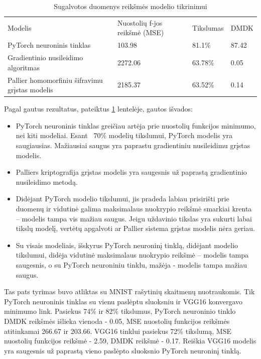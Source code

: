 \documentclass{VUMIFInfBakalaurinis}
\begin{document}
\begin{table}[h]
\begin{adjustbox}{width=\textwidth,center=\textwidth}
\begin{tabular}{|l|l|l|l|}
\cline{1-4}
Modelis & Nuostolių f-jos reikšmė (MSE) & Tikslumas & DMDK  \\\cline{1-4}
PyTorch neuroninis tinklas & 103.98 & 81.1\% & 87.42  \\\cline{1-4}
Gradientinio nusileidimo algoritmas & 2272.06 & 63.78\% & 0.05 \\\cline{1-4}
Pallier homomorfiniu šifravimu grįstas modelis & 2185.37 & 63.52\% & 0.14 \\\cline{1-4}
\end{tabular}
\end{adjustbox}
\caption{Sugalvotos duomenys reikšmės modelio tikrinimui}
\label{tab:DMDK rezultatai}
\end{table}

\par Pagal gautus rezultatus, pateiktus \ref{tab:DMDK rezultatai} lentelėje, gautos išvados:
\begin{itemize}
    \item PyTorch neuroninis tinklas greičiau artėja prie nuostolių funkcijos minimumo, nei kiti modeliai. Esant ~70\% modelių tikslumui, PyTorch modelis yra saugiausias. Mažiausiai saugus yra paprastu gradientiniu nusileidimu grįstas modelis. 
    \item Palliers kriptografija grįstas modelis yra saugesnis už paprastą gradientinio nusileidimo metodą.
    \item Didėjant PyTorch modelio tikslumui, jis pradeda labiau prisirišti prie duomenų ir vidutinė galima maksimalaus nuokrypio reikšmė smarkiai krenta – modelis tampa vis mažiau saugus. Jeigu uždavinio tikslas yra sukurti labai tikslų modelį, vertėtų apgalvoti ar Pallier sistema grįstas modelis nėra geriau.
    \item Su visais modeliais, išskyrus PyTorch neuroninį tinklą, didėjant modelio tikslumui, didėja vidutinė maksimalaus nuokrypio reikšmė – modelis tampa saugesnis, o su PyTorch neuroniniu tinklu, mažėja - modelis tampa mažiau saugus. 
\end{itemize}

\par Tas pats tyrimas buvo atliktas su MNIST rašytinių skaitmenų nuotraukomis. Tik PyTorch neuroninis tinklas su vienu paslėptu sluoksniu ir VGG16 konvergavo minimumo link. Pasiekus 74\% ir 82\% tikslumus, PyTorch neuroninio tinklo DMDK reikšmės išlieka vienoda - 0.05, MSE nuostolių funkcijos reikšmės atitinkamai 266.67 ir 203.66. VGG16 tinklui pasiekus 72\% tikslumą, MSE nuostolių funkcijos reikšmė - 2.59, DMDK reikšmė -  0.17. Reiškia VGG16 modelis yra saugesnis už paprastą vieno paslėpto sluoksnio PyTorch neuroninį tinklą.
\end{document}
